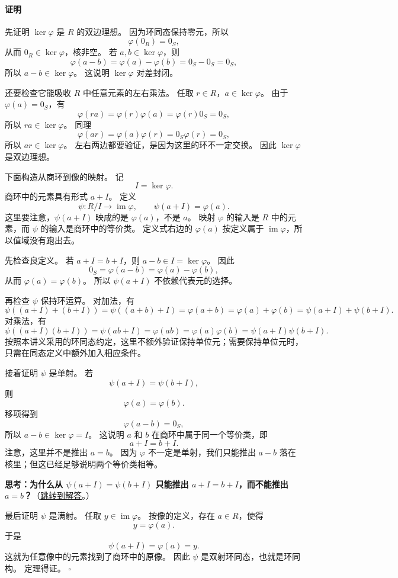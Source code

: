 \paragraph*{证明}
先证明 $\ker\varphi$ 是 $R$ 的双边理想。
因为环同态保持零元，所以
\[
\varphi(0_R)=0_S,
\]
从而 $0_R\in\ker\varphi$，核非空。
若 $a,b\in\ker\varphi$，则
\[
\varphi(a-b)=\varphi(a)-\varphi(b)=0_S-0_S=0_S,
\]
所以 $a-b\in\ker\varphi$。
这说明 $\ker\varphi$ 对差封闭。

还要检查它能吸收 $R$ 中任意元素的左右乘法。
任取 $r\in R$，$a\in\ker\varphi$。
由于 $\varphi(a)=0_S$，有
\[
\varphi(ra)=\varphi(r)\varphi(a)=\varphi(r)0_S=0_S,
\]
所以 $ra\in\ker\varphi$。
同理
\[
\varphi(ar)=\varphi(a)\varphi(r)=0_S\varphi(r)=0_S,
\]
所以 $ar\in\ker\varphi$。
左右两边都要验证，是因为这里的环不一定交换。
因此 $\ker\varphi$ 是双边理想。

下面构造从商环到像的映射。
记
\[
I=\ker\varphi.
\]
商环中的元素具有形式 $a+I$。
定义
\[
\psi:R/I\to\operatorname{im}\varphi,\qquad \psi(a+I)=\varphi(a).
\]
这里要注意，$\psi(a+I)$ 映成的是 $\varphi(a)$，不是 $a$。
映射 $\varphi$ 的输入是 $R$ 中的元素，而 $\psi$ 的输入是商环中的等价类。
定义式右边的 $\varphi(a)$ 按定义属于 $\operatorname{im}\varphi$，所以值域没有跑出去。

先检查良定义。
若 $a+I=b+I$，则 $a-b\in I=\ker\varphi$。
因此
\[
0_S=\varphi(a-b)=\varphi(a)-\varphi(b),
\]
从而 $\varphi(a)=\varphi(b)$。
所以 $\psi(a+I)$ 不依赖代表元的选择。

再检查 $\psi$ 保持环运算。
对加法，有
\[
\psi((a+I)+(b+I))
=\psi((a+b)+I)
=\varphi(a+b)
=\varphi(a)+\varphi(b)
=\psi(a+I)+\psi(b+I).
\]
对乘法，有
\[
\psi((a+I)(b+I))
=\psi(ab+I)
=\varphi(ab)
=\varphi(a)\varphi(b)
=\psi(a+I)\psi(b+I).
\]
按照本讲义采用的环同态约定，这里不额外验证保持单位元；需要保持单位元时，只需在同态定义中额外加入相应条件。

接着证明 $\psi$ 是单射。
若
\[
\psi(a+I)=\psi(b+I),
\]
则
\[
\varphi(a)=\varphi(b).
\]
移项得到
\[
\varphi(a-b)=0_S,
\]
所以 $a-b\in\ker\varphi=I$。
这说明 $a$ 和 $b$ 在商环中属于同一个等价类，即
\[
a+I=b+I.
\]
注意，这里并不是推出 $a=b$。
因为 $\varphi$ 不一定是单射，我们只能推出 $a-b$ 落在核里；但这已经足够说明两个等价类相等。

\hypertarget{q:first-isomorphism-not-a-equals-b}{}
\medskip
\noindent\textbf{思考：为什么从 $\psi(a+I)=\psi(b+I)$ 只能推出 $a+I=b+I$，而不能推出 $a=b$？}（\hyperlink{ans:first-isomorphism-not-a-equals-b}{跳转到解答}。）
\medskip

最后证明 $\psi$ 是满射。
任取 $y\in\operatorname{im}\varphi$。
按像的定义，存在 $a\in R$，使得
\[
y=\varphi(a).
\]
于是
\[
\psi(a+I)=\varphi(a)=y.
\]
这就为任意像中的元素找到了商环中的原像。
因此 $\psi$ 是双射环同态，也就是环同构。
定理得证。 $\square$

